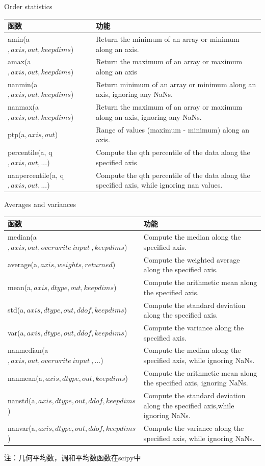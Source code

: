 \documentclass[ignorenonframetext,11pt,xcolor=dvipsnames,hyperref={colorlinks,allcolors=.,urlcolor=blue, citecolor=violet, bookmarksdepth=4},aspectratio=1610]{beamer}
\begin{document}
\begin{frame}{Order statistics}
\protect\hypertarget{order-statistics}{}

\begin{longtable}[]{@{}ll@{}}
\toprule
函数 & 功能\tabularnewline
\midrule
\endhead
amin(a\(, axis, out, keepdims\)) & Return the minimum of an array or
minimum along an axis.\tabularnewline
amax(a\(, axis, out, keepdims\)) & Return the maximum of an array or
maximum along an axis\tabularnewline
nanmin(a\(, axis, out, keepdims\)) & Return minimum of an array or
minimum along an axis, ignoring any NaNs.\tabularnewline
nanmax(a\(, axis, out, keepdims\)) & Return the maximum of an array or
maximum along an axis, ignoring any NaNs.\tabularnewline
ptp(a\(, axis, out\)) & Range of values (maximum - minimum) along an
axis.\tabularnewline
percentile(a, q\(, axis, out, ...\)) & Compute the qth percentile of the
data along the specified axis\tabularnewline
nanpercentile(a, q\(, axis, out, ...\)) & Compute the qth percentile of
the data along the specified axis, while ignoring nan
values.\tabularnewline
\bottomrule
\end{longtable}

\end{frame}

\begin{frame}{Averages and variances}
\protect\hypertarget{averages-and-variances}{}

\begin{longtable}[]{@{}ll@{}}
\toprule
函数 & 功能\tabularnewline
\midrule
\endhead
median(a\(, axis, out, overwrite~input~, keepdims\)) & Compute the
median along the specified axis.\tabularnewline
average(a\(, axis, weights, returned\)) & Compute the weighted average
along the specified axis.\tabularnewline
mean(a\(, axis, dtype, out, keepdims\)) & Compute the arithmetic mean
along the specified axis.\tabularnewline
std(a\(, axis, dtype, out, ddof, keepdims\)) & Compute the standard
deviation along the specified axis.\tabularnewline
var(a\(, axis, dtype, out, ddof, keepdims\)) & Compute the variance
along the specified axis.\tabularnewline
nanmedian(a\(, axis, out, overwrite~input~, ...\)) & Compute the median
along the specified axis, while ignoring NaNs.\tabularnewline
nanmean(a\(, axis, dtype, out, keepdims\)) & Compute the arithmetic mean
along the specified axis, ignoring NaNs.\tabularnewline
nanstd(a\(, axis, dtype, out, ddof, keepdims\)) & Compute the standard
deviation along the specified axis,while ignoring NaNs.\tabularnewline
nanvar(a\(, axis, dtype, out, ddof, keepdims\)) & Compute the variance
along the specified axis, while ignoring NaNs.\tabularnewline
\bottomrule
\end{longtable}

注：几何平均数，调和平均数函数在scipy中

\end{frame}
\end{document}
